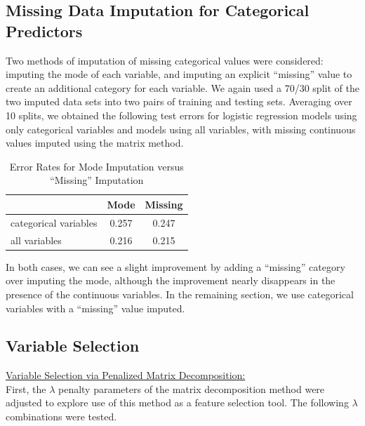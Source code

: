 \documentclass{article}
\begin{document}
\subsection{Missing Data Imputation for Categorical Predictors}

Two methods of imputation of missing categorical values were considered: imputing the mode of each variable, and imputing an explicit ``missing'' value to create an additional category for each variable.  We again used a 70/30 split of the two imputed data sets into two pairs of training and testing sets.  Averaging over 10 splits, we obtained the following test errors for logistic regression models using only categorical variables and models using all variables, with missing continuous values imputed using the matrix method.
\begin{table}[H]
	\caption{Error Rates for Mode Imputation versus ``Missing'' Imputation}
	\label{Categorical Imputation}
	\centering
	\begin{tabular}{lcc}
		\toprule
								& Mode	& Missing	\\
		\midrule
		categorical variables	& 0.257	& 0.247		\\
		all variables			& 0.216	& 0.215		\\
		\bottomrule
	\end{tabular}
\end{table}
In both cases, we can see a slight improvement by adding a ``missing'' category over imputing the mode, although the improvement nearly disappears in the presence of the continuous variables.  In the remaining section, we use categorical variables with a ``missing'' value imputed.



\subsection{Variable Selection}

\underline{Variable Selection via Penalized Matrix Decomposition:}\\

First, the $\lambda$ penalty parameters of the matrix decomposition method were adjusted to explore use of this method as a feature selection tool.  The following $\lambda$ combinations were tested.
\end{document}
